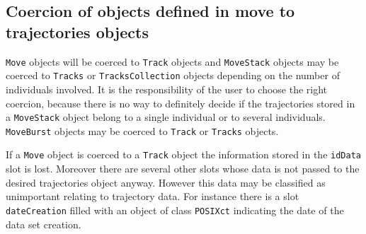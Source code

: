 \documentclass[12pt, oneside, a4paper]{scrbook}
\newcommand{\pkg}[1]{{\normalfont\fontseries{b}\selectfont #1}}
\let\code=\texttt
\begin{document}
\par\medskip



\subsection*{Coercion of objects defined in \pkg{move} to \pkg{trajectories} objects}
\label{subsec:coercemovetotraj}

\code{Move} objects will be coerced to \code{Track} objects and \code{MoveStack} objects may be coerced to \code{Tracks} or \code{TracksCollection} objects depending on the number of individuals involved. It is the responsibility of the user to choose the right coercion, because there is no way to definitely decide if the trajectories stored in a \code{MoveStack} object belong to a single individual or to several individuals. \code{MoveBurst} objects may be coerced to \code{Track} or \code{Tracks} objects.
\par\medskip

If a \code{Move} object is coerced to a \code{Track} object the information stored in the \code{idData} slot is lost. Moreover there are several other slots whose data is not passed to the desired \pkg{trajectories} object anyway. However this data may be classified as unimportant relating to trajectory data. For instance there is a slot \code{dateCreation} filled with an object of class \code{POSIXct} indicating the date of the data set creation.

\par\medskip
\end{document}

